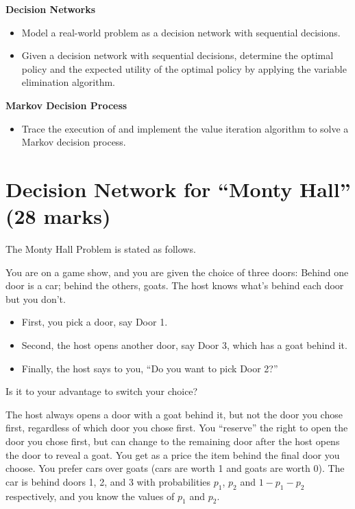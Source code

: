 \documentclass[12pt]{article}
\begin{document}
{\bf Decision Networks}

\begin{itemize}
\item 
Model a real-world problem as a decision network with sequential decisions.
\item
Given a decision network with sequential decisions, determine the optimal policy and the expected utility of the optimal policy by applying the variable elimination algorithm.
\end{itemize}

{\bf Markov Decision Process}
\begin{itemize}
\item
Trace the execution of and implement the value iteration algorithm to solve a Markov decision process.
\end{itemize}


\newpage
\section{Decision Network for ``Monty Hall'' (28 marks)}

The Monty Hall Problem is stated as follows.

You are on a game show, and you are given the choice of three doors: Behind one door is a car; behind the others, goats. The host knows what's behind each door but you don't.

\begin{itemize}

\item 
First, you pick a door, say Door 1.

\item 
Second, the host opens another door, say Door 3, which has a goat behind it.

\item 
Finally, the host says to you, ``Do you want to pick Door 2?'' 
\end{itemize}

Is it to your advantage to switch your choice? 

The host always opens a door with a goat behind it, but not the door you chose first, regardless of which door you chose first. You ``reserve'' the right to open the door you chose first, but can change to the remaining door after the host opens the door to reveal a goat. You get as a price the item behind the final door you choose. You prefer cars over goats (cars are worth 1 and goats are worth 0). The car is behind doors 1, 2, and 3 with probabilities $p_1$, $p_2$ and $1 - p_1 - p_2$ respectively, and you know the values of $p_1$ and $p_2$.
\end{document}
